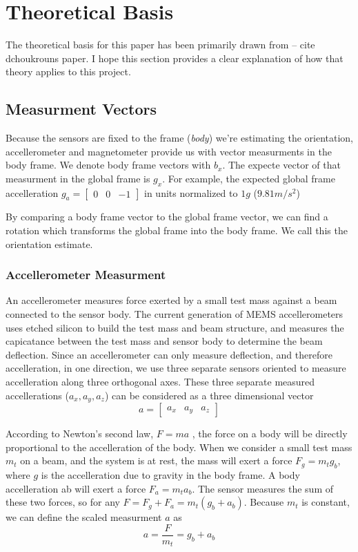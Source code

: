 \documentclass[12pt]{report}
\begin{document}
\section{Theoretical Basis}

The theoretical basis for this paper has been primarily drawn from -- cite dchoukrouns paper. I hope this section provides a clear explanation of how that theory applies to this project.

\subsection{Measurment Vectors}
Because the sensors are fixed to the frame (\emph{body}) we're estimating the orientation, accellerometer and magnetometer provide us with vector measurments in the body frame. We denote body frame vectors with $b_x$. The expecte vector of that measurment in the global frame is $g_x$. For example, the expected global frame accelleration $g_a = \begin{bmatrix} 0 & 0 & -1\end{bmatrix} $ in units normalized to $1g$ ($9.81m/s^2$)

By comparing a body frame vector to the global frame vector, we can find a rotation which transforms the global frame into the body frame. We call this the orientation estimate.  

\subsubsection{Accellerometer Measurment}

An accellerometer measures force exerted by a small test mass against a beam connected to the sensor body. The current generation of MEMS accellerometers uses etched silicon to build the test mass and beam structure, and measures the capicatance between the test mass and sensor body to determine the beam deflection. Since an accellerometer can only measure deflection, and therefore accelleration, in one direction, we use three separate sensors oriented to measure accelleration along three orthogonal axes. These three separate measured accellerations ($a_x, a_y, a_z$) can be considered as a three dimensional vector 
\begin{equation} \label{eq:defa}
  a = \begin{bmatrix}a_x&a_y&a_z \end{bmatrix}
\end{equation}

According to Newton's second law, $F = m a$ , the force on a body will be directly proportional to the accelleration of the body. When we consider a small test mass $m_t$ on a beam, and the system is at rest, the mass will exert a force $F_g = m_t g_b$, where $g$ is the accelleration due to gravity in the body frame. A body accelleration ab will exert a force $F_a = m_t a_b$. The sensor measures the sum of these two forces, so for any $F = F_g + F_a = m_t ( g_b + a_b )$. Because $m_t$ is constant, we can define the scaled measurment $a$ as 
\begin{equation} \label{eq:defza}
  a = \frac{F}{m_t} = g_b + a_b
\end{equation} 
 
\end{document}
